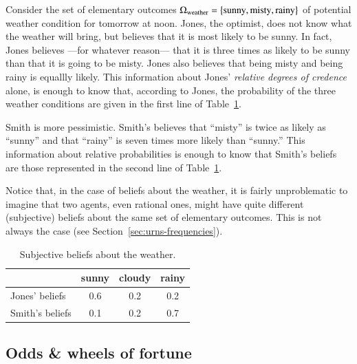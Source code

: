 \documentclass[nobib,nofonts]{tufte-handout}
\begin{document}
\begin{example}
  Consider the set of elementary outcomes $\Omega_{\text{weather}} = \left\{\text{sunny}, \text{misty}, \text{rainy}\right\}$ of potential weather condition for tomorrow at noon.
Jones, the optimist, does not know what the weather will bring, but believes that it is most likely to be sunny.
In fact, Jones believes ---for whatever reason--- that it is three times as likely to be sunny than that it is going to be misty.
Jones also believes that being misty and being rainy is equallly likely.
This information about Jones' \emph{relative degrees of credence} alone, is enough to know that, according to Jones, the probability of the three weather conditions are given in the first line of Table~\ref{tab:beliefs-weather}.

Smith is more pessimistic.
Smith's believes that ``misty'' is twice as likely as ``sunny'' and that ``rainy'' is seven times more likely than ``sunny.''
This information about relative probabilities is enough to know that Smith's beliefs are those represented in the second line of Table~\ref{tab:beliefs-weather}.

Notice that, in the case of beliefs about the weather, it is fairly unproblematic to imagine that two agents, even rational ones, might have quite different (subjective) beliefs about the same set of elementary outcomes.
This is not always the case (see Section~\ref{sec:urns-frequencies}).

\begin{table}
  \centering
  \begin{tabular}{lccc}
    & sunny & cloudy & rainy \\ \midrule
    Jones' beliefs  & 0.6   & 0.2    & 0.2   \\
    Smith's beliefs & 0.1   & 0.2    & 0.7   \\
  \end{tabular}

  \caption{Subjective beliefs about the weather.}
  \label{tab:beliefs-weather}
\end{table}
\end{example}

\subsection{Odds \& wheels of fortune}
\end{document}
